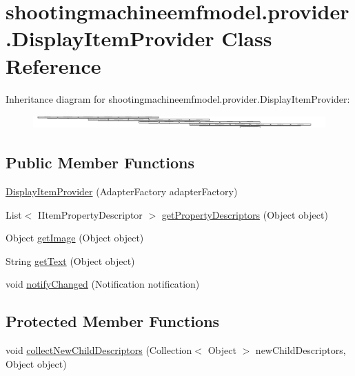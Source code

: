 \hypertarget{classshootingmachineemfmodel_1_1provider_1_1_display_item_provider}{\section{shootingmachineemfmodel.\-provider.\-Display\-Item\-Provider Class Reference}
\label{classshootingmachineemfmodel_1_1provider_1_1_display_item_provider}
}
Inheritance diagram for shootingmachineemfmodel.\-provider.\-Display\-Item\-Provider\-:\begin{figure}[H]
\begin{center}
\leavevmode
\includegraphics[height=0.534759cm]{classshootingmachineemfmodel_1_1provider_1_1_display_item_provider}
\end{center}
\end{figure}
\subsection*{Public Member Functions}
\begin{DoxyCompactItemize}
\item 
\hyperlink{classshootingmachineemfmodel_1_1provider_1_1_display_item_provider_aa9ecd0252d00dd2a341515b218011136}{Display\-Item\-Provider} (Adapter\-Factory adapter\-Factory)
\item 
List$<$ I\-Item\-Property\-Descriptor $>$ \hyperlink{classshootingmachineemfmodel_1_1provider_1_1_display_item_provider_ae760e3bbbb5b4fec5740e81936581458}{get\-Property\-Descriptors} (Object object)
\item 
Object \hyperlink{classshootingmachineemfmodel_1_1provider_1_1_display_item_provider_ae2dc5483a34d4aad2b58eccd0f745bf1}{get\-Image} (Object object)
\item 
String \hyperlink{classshootingmachineemfmodel_1_1provider_1_1_display_item_provider_aaec650e716f33c6d551fed50dc567e8d}{get\-Text} (Object object)
\item 
void \hyperlink{classshootingmachineemfmodel_1_1provider_1_1_display_item_provider_a97d304a16adf6f4c82baffce3a89aa41}{notify\-Changed} (Notification notification)
\end{DoxyCompactItemize}
\subsection*{Protected Member Functions}
\begin{DoxyCompactItemize}
\item 
void \hyperlink{classshootingmachineemfmodel_1_1provider_1_1_display_item_provider_a409985ef377a87812b61a0795f79c2fe}{collect\-New\-Child\-Descriptors} (Collection$<$ Object $>$ new\-Child\-Descriptors, Object object)
\end{DoxyCompactItemize}


